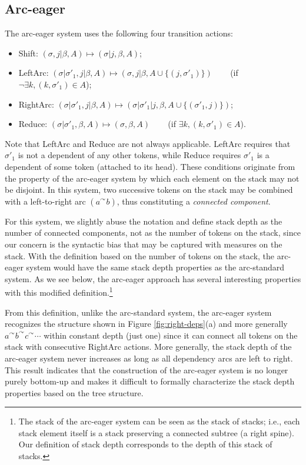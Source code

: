 \documentclass[english]{jnlp_1.4}
\begin{document}
\subsection{Arc-eager}

The arc-eager system \cite{Nivre2003} uses the following four transition actions:
\begin{itemize}
 \item {\sc Shift}: $(\sigma,j|\beta,A) \mapsto (\sigma | j, \beta, A)$;
 \item {\sc LeftArc}: $(\sigma|\sigma'_1, j|\beta, A) \mapsto (\sigma, j|\beta, A \cup \{ (j, \sigma'_1) \})$ ~~~ (if $\neg \exists k, (k,\sigma'_1) \in A$);
 \item {\sc RightArc}: $(\sigma|\sigma'_1, j|\beta, A) \mapsto (\sigma|\sigma'_1|j, \beta, A \cup \{ (\sigma'_1, j) \})$;
 \item {\sc Reduce}: $(\sigma|\sigma'_1,\beta,A) \mapsto (\sigma,\beta,A)$ ~~~ (if $\exists k, (k,\sigma'_1) \in A$).
\end{itemize}
Note that {\sc LeftArc} and {\sc Reduce} are not always applicable.
{\sc LeftArc} requires that $\sigma'_1$ is not a dependent of any other tokens, while {\sc Reduce} requires $\sigma'_1$ is a dependent of some token (attached to its head).
These conditions originate from the property of the arc-eager system by which each element on the stack may not be disjoint.
In this system, two successive tokens on the stack may be combined with a left-to-right arc $(a^\curvearrowright b)$, thus constituting a {\it connected component}.

For this system, we slightly abuse the notation and define stack depth as the number of connected components, not as the number of tokens on the stack, since our concern is the syntactic bias that may be captured with measures on the stack.
With the definition based on the number of tokens on the stack, the arc-eager system would have the same stack depth properties as the arc-standard system.
As we see below, the arc-eager approach has several interesting properties with this modified definition.\footnote{The stack of the arc-eager system can be seen as the stack of stacks; i.e., each stack element itself is a stack preserving a connected subtree (a right spine). Our definition of stack depth corresponds to the depth of this stack of stacks.}

From this definition, unlike the arc-standard system, 
    the arc-eager system recognizes the structure shown in Figure \ref{fig:right-deps}(a) and 
more generally $a^\curvearrowright b^\curvearrowright c^\curvearrowright \cdots$ within constant depth (just one) since it can connect all tokens on the stack with consecutive {\sc RightArc} actions.
More generally, the stack depth of the arc-eager system never increases as long as all dependency arcs are left to right.
This result indicates that the construction of the arc-eager system is no longer purely bottom-up and makes it difficult to formally characterize the stack depth properties based on the tree structure.
\end{document}
